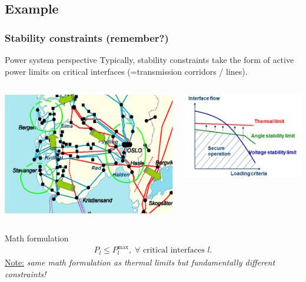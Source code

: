 \documentclass{beamer}
\begin{document}
\subsection{Example}

\begin{frame}
\frametitle{Stability constraints (remember?)}
\begin{block}{Power system perspective}
Typically, stability constraints take the form of active power limits on critical interfaces (=transmission corridors / lines). 

\begin{columns}
\begin{column}{0.3\textwidth}
\includegraphics[width=1\textwidth]{Figs/Hasle.png}    
\end{column}
\begin{column}{0.3\textwidth}
\includegraphics[width=1\textwidth]{Figs/SecurityLimits.png}
\end{column}
\end{columns}  
\end{block}
\begin{block}{Math formulation}
  \begin{align*}
    P_l \leq P_l^{\text{max}}, \; \forall \text{ critical interfaces } l.
  \end{align*}
\underline{Note:} \emph{same math formulation as thermal limits but fundamentally different constraints!}
\end{block}
\end{frame}
\end{document}
